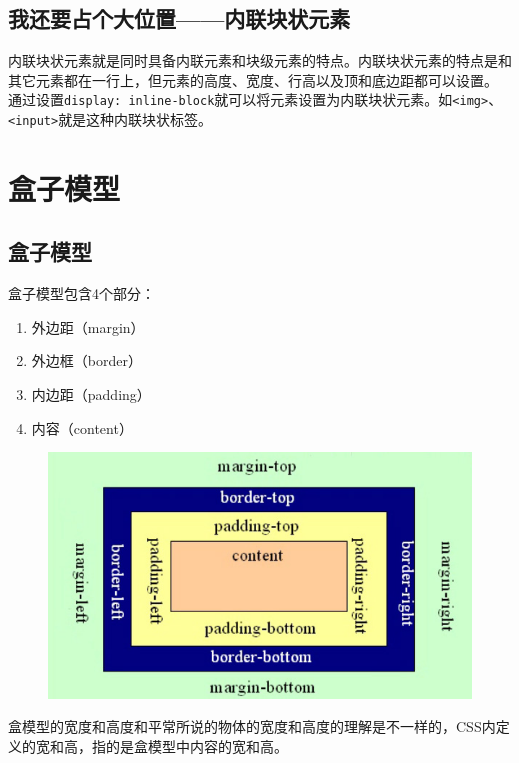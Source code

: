 \subsection{我还要占个大位置——内联块状元素}

内联块状元素就是同时具备内联元素和块级元素的特点。内联块状元素的特点是和其它元素都在一行上，但元素的高度、宽度、行高以及顶和底边距都可以设置。 \\

通过设置\lstinline|display: inline-block|就可以将元素设置为内联块状元素。如\lstinline|<img>|、\lstinline|<input>|就是这种内联块状标签。

\newpage

\section{盒子模型}

\subsection{盒子模型}

盒子模型包含4个部分：

\begin{enumerate}
    \item 外边距（margin）
    \item 外边框（border）
    \item 内边距（padding）
    \item 内容（content）
\end{enumerate}

\begin{figure}[H]
    \centering
    \includegraphics[scale=0.7]{img/C8/8-2/1.png}
\end{figure}

盒模型的宽度和高度和平常所说的物体的宽度和高度的理解是不一样的，CSS内定义的宽和高，指的是盒模型中内容的宽和高。 \\

